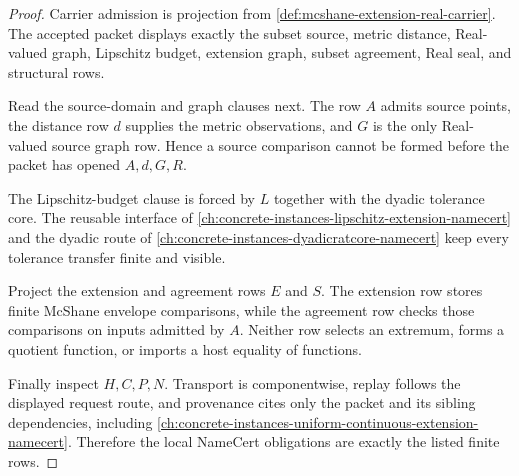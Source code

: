\begin{proof}
Carrier admission is projection from \autoref{def:mcshane-extension-real-carrier}. The accepted packet displays exactly the subset source, metric distance, Real-valued graph, Lipschitz budget, extension graph, subset agreement, Real seal, and structural rows.

Read the source-domain and graph clauses next. The row $A$ admits source points, the distance row $d$ supplies the metric observations, and $G$ is the only Real-valued source graph row. Hence a source comparison cannot be formed before the packet has opened $A,d,G,R$.

The Lipschitz-budget clause is forced by $L$ together with the dyadic tolerance core. The reusable interface of \autoref{ch:concrete-instances-lipschitz-extension-namecert} and the dyadic route of \autoref{ch:concrete-instances-dyadicratcore-namecert} keep every tolerance transfer finite and visible.

Project the extension and agreement rows $E$ and $S$. The extension row stores finite McShane envelope comparisons, while the agreement row checks those comparisons on inputs admitted by $A$. Neither row selects an extremum, forms a quotient function, or imports a host equality of functions.

Finally inspect $H,C,P,N$. Transport is componentwise, replay follows the displayed request route, and provenance cites only the packet and its sibling dependencies, including \autoref{ch:concrete-instances-uniform-continuous-extension-namecert}. Therefore the local NameCert obligations are exactly the listed finite rows.
\end{proof}

